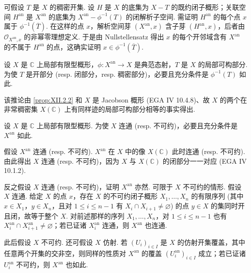 可假设 $T$ 是 $X$ 的稠密开集. 设 $H$ 是 $X$ 的底集为 $X - T$ 的既约闭子概形；关联空间 $H^{\mathrm{an}}$ 是 $X^{\mathrm{an}}$ 的底集为 $X^{\mathrm{an}} - \phi^{-1}(T)$ 的闭解析子空间. 需证明 $H^{\mathrm{an}}$ 的每个点 $x$ 属于 $\phi^{-1}(\overline{T})$. 在这样的点 $x$，解析空间芽 $(X^{\mathrm{an}}, x)$ 含子芽 $(H^{\mathrm{an}}, x)$，后者由 $\mathcal{O}_{X^{\mathrm{an}},x}$ 的非幂零理想定义. 于是由 Nullstellensatz \cite[第 19 号 §4 推论 3]{exp12-4} 得出 $x$ 的每个开邻域含有 $X^{\mathrm{an}}$ 的不属于 $H^{\mathrm{an}}$ 的点，这确实证明 $x \in \phi^{-1}(\overline{T})$.

\begin{corollary}\label{cor:XII.2.3}
设 $X$ 是 $\mathbb{C}$ 上局部有限型概形，$\phi \colon X^{\mathrm{an}} \to X$ 是典范态射，$T$ 是 $X$ 的局部可构部分. 为使 $T$ 是开部分 (resp. 闭部分，resp. 稠密部分)，必要且充分条件是 $\phi^{-1}(T)$ 如此.
\end{corollary}

该推论由 \ref{prop:XII.2.2} 和 $X$ 是 Jacobson 概形 (EGA IV 10.4.8)、故 $X$ 的两个在非常稠密集 $X(\mathbb{C})$ 上有同样迹的局部可构部分相等的事实得出.

\begin{proposition}\label{prop:XII.2.4}
设 $X$ 是 $\mathbb{C}$ 上局部有限型概形. 为使 $X$ 连通 (resp. 不可约)，必要且充分条件是 $X^{\mathrm{an}}$ 如此.
\end{proposition}

假设 $X^{\mathrm{an}}$ 连通 (resp. 不可约). $X^{\mathrm{an}}$ 在 $X$ 中的像 $X(\mathbb{C})$ 此时连通 (resp. 不可约). 由此得出 $X$ 连通 (resp. 不可约)，因为 $X$ 与 $X(\mathbb{C})$ 的闭部分一一对应 (EGA IV 10.1.2).

反之假设 $X$ 连通 (resp. 不可约)，证明 $X^{\mathrm{an}}$ 亦然. 可限于 $X$ 不可约的情形. 假设 $X$ 连通. 给定 $X$ 的点 $x$，存在 $X$ 的不可约闭子概形 $X_1, \ldots, X_n$ 的有限序列 (其中 $x \in X_1$，$y \in X_n$，且对 $1 \leqslant i \leqslant n - 1$ 有 $X_i \cap X_{i+1} \neq \varnothing$) 的点 $y \in X$ 的集同时开且闭，故等于整个 $X$. 对前述那样的序列 $X_1, \ldots, X_n$，对 $1 \leqslant i \leqslant n - 1$ 也有 $X_i^{\mathrm{an}} \cap X_{i+1}^{\mathrm{an}} \neq \varnothing$；若已证诸 $X_i^{\mathrm{an}}$ 连通，则 $X^{\mathrm{an}}$ 也连通.

此后假设 $X$ 不可约. 还可假设 $X$ 仿射. 若 $(U_i)_{i \in I}$ 是 $X$ 的仿射开集覆盖，其中任意两个开集的交非空，则同样的性质对 $X^{\mathrm{an}}$ 的覆盖 $(U_i^{\mathrm{an}})_{i \in I}$ 成立；若已证诸 $U_i^{\mathrm{an}}$ 不可约，则 $X^{\mathrm{an}}$ 也如此.

